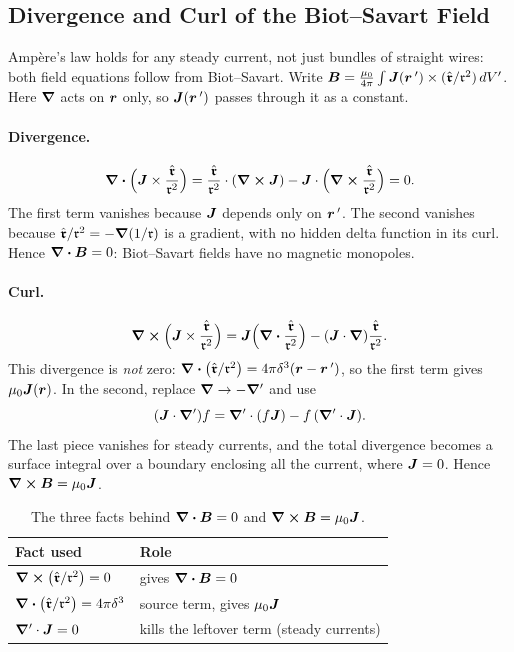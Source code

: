 \subsection{Divergence and Curl of the Biot--Savart Field}
\label{sec:em-bs-div-curl}

Ampère's law holds for any steady current, not just bundles of straight wires: both field equations follow from Biot--Savart. Write $\vect{B} = \frac{\mu_0}{4\pi}\int\vect{J}(\lvect{r}\,')\times(\hat{\lvect{\mathfrak{r}}}/\mathfrak{r}^2)\,dV'$. Here $\grad$ acts on $\bm{r}$ only, so $\vect{J}(\lvect{r}\,')$ passes through it as a constant.

\paragraph{Divergence.}
\[
    \div\Bigl(\vect{J}\times\frac{\hat{\lvect{\mathfrak{r}}}}{\mathfrak{r}^2}\Bigr)
    = \frac{\hat{\lvect{\mathfrak{r}}}}{\mathfrak{r}^2}\cdot(\curl\vect{J}) - \vect{J}\cdot\Bigl(\curl\frac{\hat{\lvect{\mathfrak{r}}}}{\mathfrak{r}^2}\Bigr) = 0 .
\]
The first term vanishes because $\vect{J}$ depends only on $\bm{r}\,'$. The second vanishes because $\hat{\bm{\mathfrak{r}}}/\mathfrak{r}^2 = -\grad(1/\mathfrak{r})$ is a gradient, with no hidden delta function in its curl. Hence $\div\vect{B} = 0$: Biot--Savart fields have no magnetic monopoles.

\paragraph{Curl.}
\[
    \curl\Bigl(\vect{J}\times\frac{\hat{\lvect{\mathfrak{r}}}}{\mathfrak{r}^2}\Bigr)
    = \vect{J}\Bigl(\div\frac{\hat{\lvect{\mathfrak{r}}}}{\mathfrak{r}^2}\Bigr) - (\vect{J}\cdot\grad)\frac{\hat{\lvect{\mathfrak{r}}}}{\mathfrak{r}^2} .
\]
This divergence is \emph{not} zero: $\div(\hat{\bm{\mathfrak{r}}}/\mathfrak{r}^2) = 4\pi\delta^3(\bm{r}-\bm{r}\,')$, so the first term gives $\mu_0\vect{J}(\lvect{r})$. In the second, replace $\grad\to-\grad'$ and use
\[
    (\vect{J}\cdot\grad')f = \grad'\cdot(f\vect{J}) - f\,(\grad'\cdot\vect{J}) .
\]
The last piece vanishes for steady currents, and the total divergence becomes a surface integral over a boundary enclosing all the current, where $\vect{J} = 0$. Hence $\curl\vect{B} = \mu_0\vect{J}$.

\begin{table}[ht]
\centering
\renewcommand{\arraystretch}{1.4}
\begin{tabular}{l|l}
    Fact used & Role\\\hline
    $\curl(\hat{\bm{\mathfrak{r}}}/\mathfrak{r}^2) = 0$ & gives $\div\vect{B} = 0$\\
    $\div(\hat{\bm{\mathfrak{r}}}/\mathfrak{r}^2) = 4\pi\delta^3$ & source term, gives $\mu_0\vect{J}$\\
    $\grad'\cdot\vect{J} = 0$ & kills the leftover term (steady currents)
\end{tabular}
\caption{The three facts behind $\div\vect{B} = 0$ and $\curl\vect{B} = \mu_0\vect{J}$.}
\end{table}


